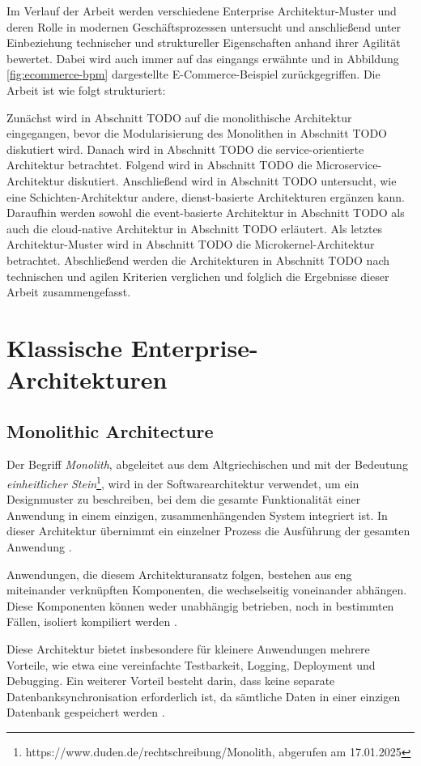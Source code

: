 \documentclass[acmtog]{acmart}
\begin{document}
Im Verlauf der Arbeit werden verschiedene Enterprise Architektur-Muster und deren Rolle in modernen Geschäftsprozessen untersucht
und anschließend unter Einbeziehung technischer und struktureller Eigenschaften anhand ihrer Agilität bewertet.
Dabei wird auch immer auf das eingangs erwähnte und in Abbildung \ref{fig:ecommerce-bpm} dargestellte E-Commerce-Beispiel zurückgegriffen.
Die Arbeit ist wie folgt strukturiert:

Zunächst wird in Abschnitt TODO auf die monolithische Architektur eingegangen, bevor die Modularisierung des Monolithen in Abschnitt TODO diskutiert wird.
Danach wird in Abschnitt TODO die service-orientierte Architektur betrachtet.
Folgend wird in Abschnitt TODO die Microservice-Architektur diskutiert.
Anschließend wird in Abschnitt TODO untersucht, wie eine Schichten-Architektur andere, dienst-basierte Architekturen ergänzen kann.
Daraufhin werden sowohl die event-basierte Architektur in Abschnitt TODO als auch die cloud-native Architektur in Abschnitt TODO erläutert.
Als letztes Architektur-Muster wird in Abschnitt TODO die Microkernel-Architektur betrachtet.
Abschließend werden die Architekturen in Abschnitt TODO nach technischen und agilen Kriterien verglichen und folglich die Ergebnisse dieser Arbeit zusammengefasst.

\section{Klassische Enterprise-Architekturen}
\subsection{Monolithic Architecture}
Der Begriff \textit{Monolith}, abgeleitet aus dem Altgriechischen und mit der Bedeutung
\textit{einheitlicher Stein}\footnote{https://www.duden.de/rechtschreibung/Monolith, abgerufen am 17.01.2025},
wird in der Softwarearchitektur verwendet, um ein Designmuster zu beschreiben, bei dem die gesamte Funktionalität
einer Anwendung in einem einzigen, zusammenhängenden System integriert ist.
In dieser Architektur übernimmt ein einzelner Prozess die Ausführung der gesamten Anwendung \cite[1]{mono}.

Anwendungen, die diesem Architekturansatz folgen, bestehen aus eng miteinander verknüpften
Komponenten, die wechselseitig voneinander abhängen.
Diese Komponenten können weder unabhängig betrieben, noch in bestimmten Fällen,
isoliert kompiliert werden \cite[485]{mono3}.

Diese Architektur bietet insbesondere für kleinere Anwendungen mehrere Vorteile,
wie etwa eine vereinfachte Testbarkeit, Logging, Deployment und Debugging. Ein
weiterer Vorteil besteht darin, dass keine separate Datenbanksynchronisation
erforderlich ist, da sämtliche Daten in einer einzigen Datenbank gespeichert
werden \cite[20358]{mono4}.
\end{document}
